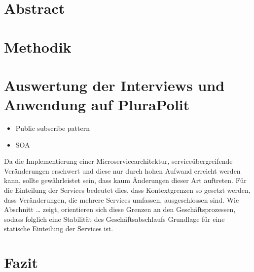 \documentclass[a4paper, 12pt, headsepline]{scrartcl}
\begin{document}


\newpage
{}

\section*{Abstract}

\newpage

\tableofcontents

\newpage
{}
\setcounter{page}{1}


\newpage



\section{Methodik}
\section{Auswertung der Interviews und Anwendung auf PluraPolit}
\begin{itemize}
	\item Public subscribe pattern
	\item SOA 
\end{itemize}

Da die Implementierung einer Microservicearchitektur, serviceübergreifende Veränderungen erschwert und diese nur durch hohen Aufwand erreicht werden kann, sollte gewährleistet sein, dass kaum Änderungen dieser Art auftreten. Für die Einteilung der Services bedeutet dies, dass Kontextgrenzen so gesetzt werden, dass Veränderungen, die mehrere Services umfassen, ausgeschlossen sind. Wie Abschnitt … zeigt, orientieren sich diese Grenzen an den Geschäftsprozessen, sodass folglich eine Stabilität des Geschäftsabschlaufs Grundlage für eine statische Einteilung der Services ist.

\section{Fazit}

\newpage

\printbibliography[title=Literaturverzeichnis]

\newpage

\listoffigures

\newpage


\end{document}
